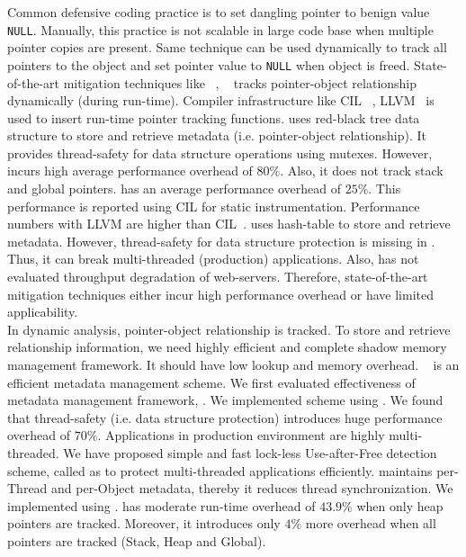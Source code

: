 Common defensive coding practice is to set dangling pointer to benign value \texttt{NULL}. Manually, this practice is not scalable in large code base when multiple pointer copies are present. Same technique can be used dynamically to track all pointers to the object and set pointer value to \texttt{NULL} when object is freed. State-of-the-art mitigation techniques like \dangnull{} ~\cite{lee2015dangnull}, \freesentry{}~\cite{younan2015freesentry} tracks pointer-object relationship dynamically (during run-time). Compiler infrastructure like CIL ~\cite{necula2002cil}, LLVM~\cite{lattner2004llvm} is used to insert run-time pointer tracking functions. \dangnull{} uses red-black tree data structure to store and retrieve metadata (i.e. pointer-object relationship). It provides thread-safety for data structure operations using mutexes. However, \dangnull{} incurs high average performance overhead of $80\%$. Also, it does not track stack and global pointers. \freesentry{} has an average performance overhead of $25\%$. This performance is reported using CIL for static instrumentation. Performance numbers with LLVM are higher than CIL~\cite{freesentrypppt}. \freesentry{} uses hash-table to store and retrieve metadata. However, thread-safety for data structure protection is missing in \freesentry{}. Thus, it can break multi-threaded (production) applications. Also, \freesentry{} has not evaluated throughput degradation of web-servers. Therefore, state-of-the-art mitigation techniques either incur high performance overhead or have limited applicability. \\%

In dynamic analysis, pointer-object relationship is tracked. To store and retrieve relationship information, we need highly efficient and complete shadow memory management framework. It should have low lookup and memory overhead. \metalloc{} ~\cite{istvan2016metalloc} is an efficient metadata management scheme. We first evaluated effectiveness of metadata management framework, \metalloc{}. We implemented \freesentry{} scheme using \metalloc{}. We found that thread-safety (i.e. data structure protection) introduces huge performance overhead of $70\%$. Applications in production environment are highly multi-threaded. We have proposed simple and fast lock-less Use-after-Free detection scheme, called as \projectname{} to protect multi-threaded applications efficiently. \projectname{} maintains per-Thread and per-Object metadata, thereby it reduces thread synchronization. We implemented \projectname{} using \metalloc{}. \projectname{} has moderate run-time overhead of $43.9\%$ when only heap pointers are tracked. Moreover, it introduces only $4\%$ more overhead when all pointers are tracked (Stack, Heap and Global).
